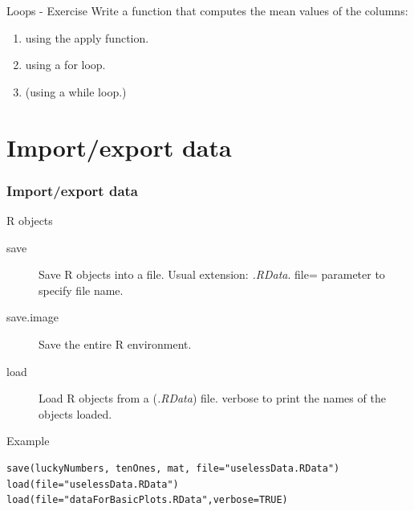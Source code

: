 \documentclass[10pt]{beamer}
\newenvironment{xframe}[2][]
  {\begin{frame}[fragile,environment=xframe,#1]
  \frametitle{#2}}
  {\end{frame}}
\begin{document}

\begin{frame}{Loops - Exercise}
  Write a function that computes the mean values of the columns:
  \begin{enumerate}
  \item using the {\sf apply}  function.
  \item using a {\sf for} loop.
  \item (using a {\sf while} loop.)
  \end{enumerate}
\end{frame}


\section{Import/export data}

\begin{xframe}{Import/export data}
  \begin{block}{R objects}
    \begin{description}
      \item[save] Save R objects into a file. Usual extension: {\it .RData}. {\sf file=} parameter to specify file name.
      \item[save.image] Save the entire R environment.
      \item[load] Load R objects from a ({\it .RData}) file. {\sf verbose} to print the names of the objects loaded.
    \end{description}
  \end{block}
  \begin{exampleblock}{Example}
\begin{verbatim}
save(luckyNumbers, tenOnes, mat, file="uselessData.RData")
load(file="uselessData.RData")
load(file="dataForBasicPlots.RData",verbose=TRUE)
\end{verbatim}  
  \end{exampleblock}
\end{xframe}

\end{document}
